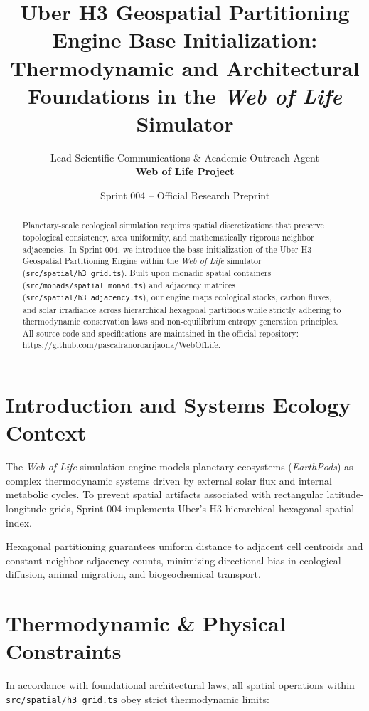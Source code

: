 \documentclass[11pt, a4paper]{article}
\title{\textbf{Uber H3 Geospatial Partitioning Engine Base Initialization:\\Thermodynamic and Architectural Foundations in the \textit{Web of Life} Simulator}}
\author{Lead Scientific Communications \& Academic Outreach Agent \\ \textbf{Web of Life Project}}
\date{Sprint 004 -- Official Research Preprint}
\begin{document}
\maketitle

\begin{abstract}
Planetary-scale ecological simulation requires spatial discretizations that preserve topological consistency, area uniformity, and mathematically rigorous neighbor adjacencies. In Sprint 004, we introduce the base initialization of the Uber H3 Geospatial Partitioning Engine within the \textit{Web of Life} simulator (\texttt{src/spatial/h3\_grid.ts}). Built upon monadic spatial containers (\texttt{src/monads/spatial\_monad.ts}) and adjacency matrices (\texttt{src/spatial/h3\_adjacency.ts}), our engine maps ecological stocks, carbon fluxes, and solar irradiance across hierarchical hexagonal partitions while strictly adhering to thermodynamic conservation laws and non-equilibrium entropy generation principles. All source code and specifications are maintained in the official repository: \url{https://github.com/pascalranoroarijaona/WebOfLife}.
\end{abstract}

\section{Introduction and Systems Ecology Context}
The \textit{Web of Life} simulation engine models planetary ecosystems (\textit{EarthPods}) as complex thermodynamic systems driven by external solar flux and internal metabolic cycles. To prevent spatial artifacts associated with rectangular latitude-longitude grids, Sprint 004 implements Uber's H3 hierarchical hexagonal spatial index.

Hexagonal partitioning guarantees uniform distance to adjacent cell centroids and constant neighbor adjacency counts, minimizing directional bias in ecological diffusion, animal migration, and biogeochemical transport.

\section{Thermodynamic \& Physical Constraints}
In accordance with foundational architectural laws, all spatial operations within \texttt{src/spatial/h3\_grid.ts} obey strict thermodynamic limits:
\end{document}
